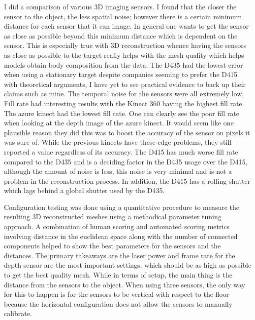 I did a comparison of various 3D imaging sensors. I found that the closer the sensor to the object, the less spatial noise; however there is a certain minimum distance for each sensor that it can image. In general one wants to get the sensor as close as possible beyond this minimum distance which is dependent on the sensor. This is especially true with 3D reconstruction whence having the sensors as close as possible to the target really helps with the mesh quality which helps models obtain body composition from the data. The D435 had the lowest error when using a stationary target despite companies seeming to prefer the D415 with theoretical arguments, I have yet to see practical evidence to back up their claims such as mine. The temporal noise for the sensors were all extremely low. Fill rate had interesting results with the Kinect 360 having the highest fill rate. The azure kinect had the lowest fill rate. One can clearly see the poor fill rate when looking at the depth image of the azure kinect. It would seem like one plausible reason they did this was to boost the accuracy of the sensor on pixels it was sure of. While the previous kinects have these edge problems, they still reported a value regardless of its accuracy. The D415 has much worse fill rate compared to the D435 and is a deciding factor in the D435 usage over the D415, although the amount of noise is less, this noise is very minimal and is not a problem in the reconstruction process. In addition, the D415 has a rolling shutter which lags behind a global shutter used by the D435.

Configuration testing was done using a quantitative procedure to measure the resulting 3D reconstructed meshes using a methodical parameter tuning approach. A combination of human scoring and automated scoring metrics involving distance in the euclidean space along with the number of connected components helped to show the best parameters for the sensors and the distances. The primary takeaways are the laser power and frame rate for the depth sensor are the most important settings, which should be as high as possible to get the best quality mesh. While in terms of setup, the main thing is the distance from the sensors to the object. When using three sensors, the only way for this to happen is for the sensors to be vertical with respect to the floor because the horizontal configuration does not allow the sensors to manually calibrate. 

